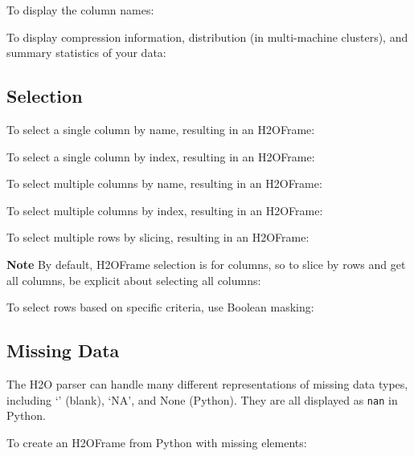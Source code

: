{\newpage
To display the column names:


To display compression information, distribution (in multi-machine clusters), and summary statistics of your data:



\subsection{Selection}
To select a single column by name, resulting in an H2OFrame:


To select a single column by index, resulting in an H2OFrame:


To select multiple columns by name, resulting in an H2OFrame:


To select multiple columns by index, resulting in an H2OFrame:


\newpage
To select multiple rows by slicing, resulting in an H2OFrame: 

\textbf{Note} By default, H2OFrame selection is for columns, so to slice by rows
and get all columns, be explicit about selecting all columns:



To select rows based on specific criteria, use Boolean masking:



\subsection{Missing Data}
The H2O parser can handle many different representations of missing data types, including `' (blank),
`NA',  and None (Python).  They are all displayed as \texttt{nan} in Python.

To create an H2OFrame from Python with missing elements:


}
